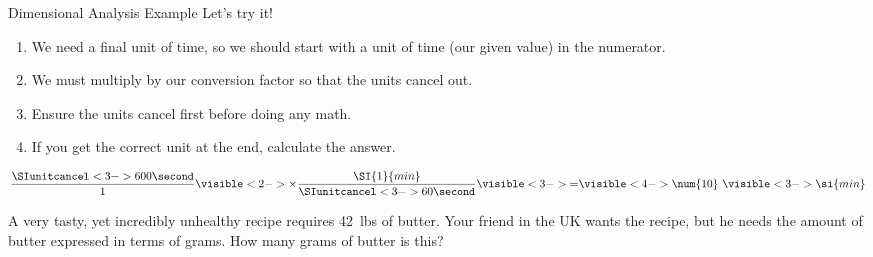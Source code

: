 \documentclass[notes=show]{beamer}
\begin{document}
\begin{frame}{Dimensional Analysis Example}
	Let's try it!

	\begin{enumerate}[<+->]
		\item We need a final unit of time, so we should start with a
			unit of time (our given value) in the \alert{numerator}.
		\item We must multiply by our conversion factor so that
			the units \alert{cancel out}.
		\item Ensure the units cancel \alert{first} before doing any
			math.
		\item If you get the correct unit at the end, calculate the
			answer.
	\end{enumerate}

	\begin{equation*}
		\frac{\SIunitcancel<3->{600}{\second}}{1} \visible<2->{\times
		\frac{\SI{1}{min}}{\SIunitcancel<3->{60}{\second}}}
		\visible<3->{=} \visible<4->{\num{10}}~\visible<3->{\si{min}}
	\end{equation*}
\end{frame}

\begin{onyourown}[5em]
	A very tasty, yet incredibly unhealthy recipe requires \SI{42}{lbs} of
	butter. Your friend in the UK wants the recipe, but he needs the amount
	of butter expressed in terms of grams. How many grams of butter is this?
\end{onyourown}
\end{document}
